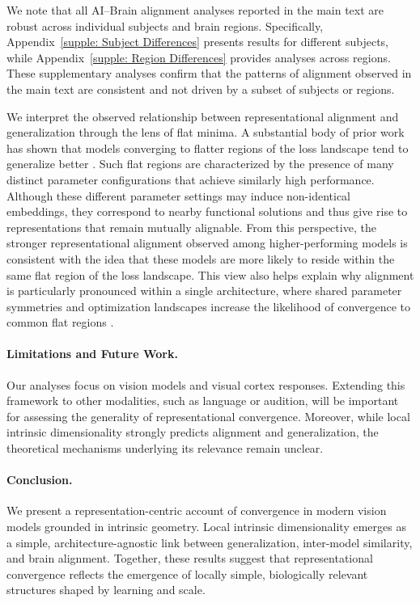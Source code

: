 \documentclass{article}
\theoremstyle{plain}
\theoremstyle{definition}
\theoremstyle{remark}
\begin{document}
We note that all AI--Brain alignment analyses reported in the main text are robust across individual subjects and brain regions.  
Specifically, Appendix~\ref{supple: Subject Differences} presents results for different subjects, while Appendix~\ref{supple: Region Differences} provides analyses across regions.  
These supplementary analyses confirm that the patterns of alignment observed in the main text are consistent and not driven by a subset of subjects or regions.



We interpret the observed relationship between representational alignment and generalization through the lens of flat minima.
A substantial body of prior work has shown that models converging to flatter regions of the loss landscape tend to generalize better \citep{hochreiter1997flat}.
Such flat regions are characterized by the presence of many distinct parameter configurations that achieve similarly high performance.
Although these different parameter settings may induce non-identical embeddings, they correspond to nearby functional solutions and thus give rise to representations that remain mutually alignable.
From this perspective, the stronger representational alignment observed among higher-performing models is consistent with the idea that these models are more likely to reside within the same flat region of the loss landscape.
This view also helps explain why alignment is particularly pronounced within a single architecture, where shared parameter symmetries and optimization landscapes increase the likelihood of convergence to common flat regions \citep{zhao2025symmetry}.






\paragraph{Limitations and Future Work.}
Our analyses focus on vision models and visual cortex responses.
Extending this framework to other modalities, such as language or audition, will be important for assessing the generality of representational convergence.
Moreover, while local intrinsic dimensionality strongly predicts alignment and generalization, the theoretical mechanisms underlying its relevance remain unclear.



\paragraph{Conclusion.}
We present a representation-centric account of convergence in modern vision models grounded in intrinsic geometry.
Local intrinsic dimensionality emerges as a simple, architecture-agnostic link between generalization, inter-model similarity, and brain alignment.
Together, these results suggest that representational convergence reflects the emergence of locally simple, biologically relevant structures shaped by learning and scale.
\end{document}
